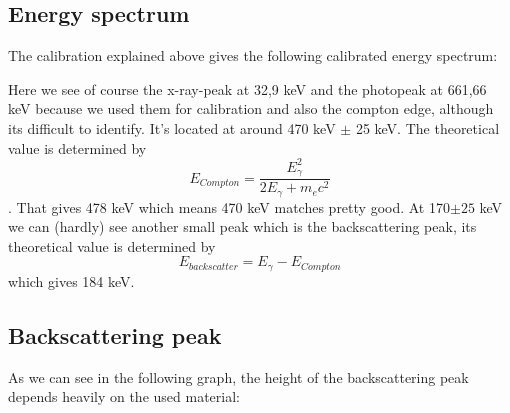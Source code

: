 \documentclass[bigchapter,colorback,accentcolor=tud4b,linedtoc,11pt]{tudreport}
\begin{document}
\subsection{Energy spectrum}

The calibration explained above gives the following calibrated energy spectrum:

\begin{center}
\begin{figure}[H]
\end{figure}
\end{center}

Here we see of course the x-ray-peak at 32,9 keV and the photopeak at 661,66 keV because we used them for calibration and also the compton edge, although its difficult to identify. It's located at around 470 keV $\pm$ 25 keV. The theoretical value is determined by
$$E_{Compton} = \frac{E_{\gamma}^2}{2E_{\gamma} + m_ec^2}$$.
That gives 478 keV which means 470 keV matches pretty good. At 170$\pm 25$ keV we can (hardly) see another small peak which is the backscattering peak, its theoretical value is determined by $$E_{backscatter} = E_{\gamma} - E_{Compton}$$
which gives 184 keV.

\subsection{Backscattering peak}

As we can see in the following graph, the height of the backscattering peak depends heavily on the used material: 
\end{document}
